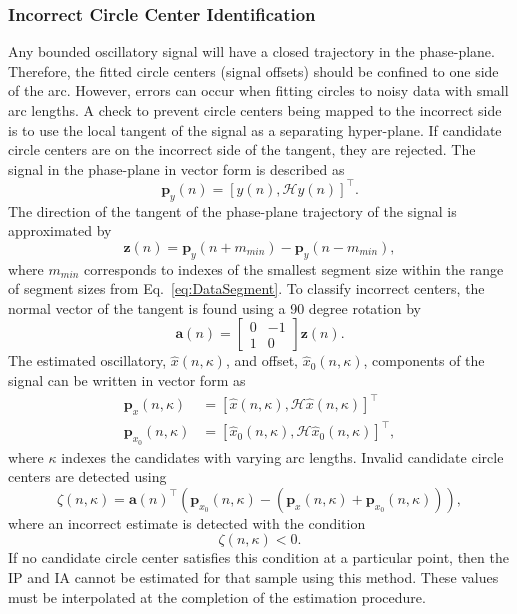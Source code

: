 \documentclass[journal,11pt,a4paper,onecolumn,draftcls]{IEEEtran}
\begin{document}
\subsubsection{Incorrect Circle Center Identification}
Any bounded oscillatory signal will have a closed trajectory in the phase-plane. Therefore, the fitted circle centers (signal offsets) should be confined to one side of the arc. However, errors can occur when fitting circles to noisy data with small arc lengths. A check to prevent circle centers being mapped to the incorrect side is to use the local tangent of the signal as a separating hyper-plane. If candidate circle centers are on the incorrect side of the tangent, they are rejected. The signal in the phase-plane in vector form is described as
\begin{equation}
	\mathbf{p}_y(n) = \left[y\left(n\right),\mathcal{H}y\left(n\right)\right]^{\top}.
\end{equation}
The direction of the tangent of the phase-plane trajectory of the signal is approximated by 
\begin{equation}
	\mathbf{z}(n) = \mathbf{p}_y(n + m_{min}) - \mathbf{p}_y(n - m_{min}),
\end{equation}
where $m_{min}$ corresponds to indexes of the smallest segment size within the range of segment sizes from Eq.~\ref{eq:DataSegment}. To classify incorrect centers, the normal vector of the tangent is found using a 90 degree rotation by
\begin{equation}
	\mathbf{a}\left(n\right) = \left[\begin{array}{cc}
	0 & -1 \\
	1 & 0\end{array}\right]\mathbf{z}(n).
\end{equation}
The estimated oscillatory, $\hat{x}(n,\kappa)$, and offset, $\hat{x}_0(n,\kappa)$, components of the signal can be written in vector form as
\begin{align}
	\mathbf{p}_x(n,\kappa) &= \left[\hat{x}\left(n,\kappa\right),\mathcal{H}\hat{x}\left(n,\kappa\right)\right]^{\top} \\ 
	\mathbf{p}_{x_0}\left(n,\kappa\right) &= \left[\hat{x}_0\left(n,\kappa\right), \mathcal{H}\hat{x}_0\left(n,\kappa\right)\right]^{\top}, 
\end{align}
where $\kappa$ indexes the candidates with varying arc lengths. Invalid candidate circle centers are detected using 
\begin{equation}
    \zeta(n,\kappa) = \mathbf{a}\left( n\right)^{\top}\left( \mathbf{p}_{x_0}\left( n,\kappa \right) - \left(\mathbf{p}_x\left( n,\kappa \right) + \mathbf{p}_{x_0}\left( n,\kappa \right)\right) \right),
\end{equation}
where an incorrect estimate is detected with the condition
\begin{equation}\label{eq:IncorrectSideClassifier}
    \zeta(n,\kappa) < 0.
\end{equation} 
If no candidate circle center satisfies this condition at a particular point, then the IP and IA cannot be estimated for that sample using this method. These values must be interpolated at the completion of the estimation procedure. 
\end{document}

